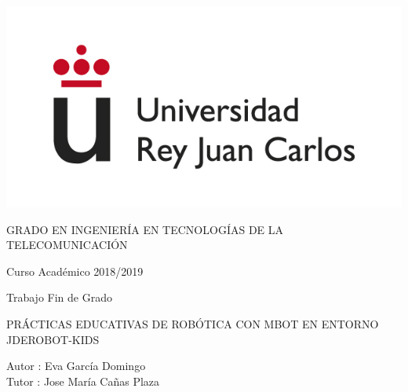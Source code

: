 \documentclass[a4paper, 12pt]{book}
\begin{document}
	\begin{titlepage}
		\centering
		\includegraphics[scale=0.5]{img/logo_urjc.jpg}
		\vspace{3cm}
		
		\Large
		GRADO EN INGENIERÍA EN TECNOLOGÍAS DE LA TELECOMUNICACIÓN
		
		\vspace{0.4cm}
		
		\large
		Curso Académico 2018/2019
		
		\vspace{0.8cm}
		
		Trabajo Fin de Grado
		
		\vspace{2.5cm}		
		\LARGE		
		PRÁCTICAS EDUCATIVAS DE ROBÓTICA CON MBOT EN ENTORNO JDEROBOT-KIDS
		
		\vspace{2.5 cm}
		
		\large
		Autor : Eva García Domingo\\
		Tutor : Jose María Cañas Plaza
		\afterpage{\null\newpage}
		\pagestyle{empty}
	\end{titlepage}
	
	
	
	
	
	\tableofcontents
	\setcounter{page}{1}
	\mainmatter

	
%	
%	
%	
	
%	

	
	
	
\end{document}

